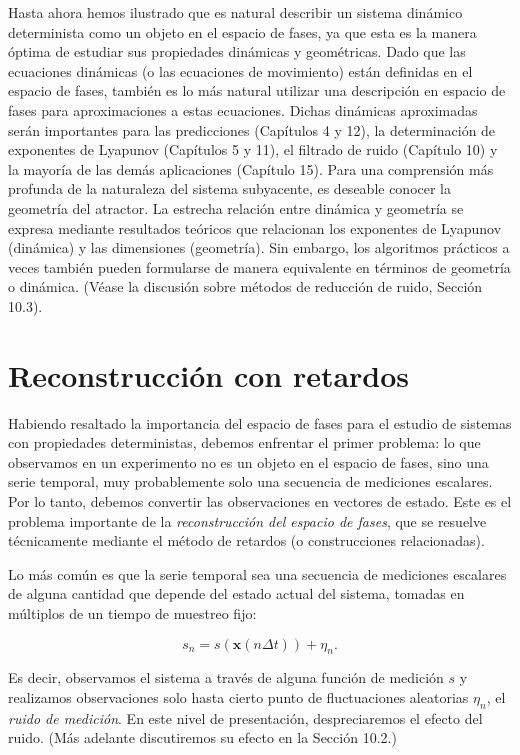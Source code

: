 \documentclass[10pt,a4paper]{book}
\begin{document}
Hasta ahora hemos ilustrado que es natural describir un sistema dinámico determinista como un objeto en el espacio de fases, ya que esta es la manera óptima de estudiar sus propiedades dinámicas y geométricas. Dado que las ecuaciones dinámicas (o las ecuaciones de movimiento) están definidas en el espacio de fases, también es lo más natural utilizar una descripción en espacio de fases para aproximaciones a estas ecuaciones. Dichas dinámicas aproximadas serán importantes para las predicciones (Capítulos 4 y 12), la determinación de exponentes de Lyapunov (Capítulos 5 y 11), el filtrado de ruido (Capítulo 10) y la mayoría de las demás aplicaciones (Capítulo 15). Para una comprensión más profunda de la naturaleza del sistema subyacente, es deseable conocer la geometría del atractor. La estrecha relación entre dinámica y geometría se expresa mediante resultados teóricos que relacionan los exponentes de Lyapunov (dinámica) y las dimensiones (geometría). Sin embargo, los algoritmos prácticos a veces también pueden formularse de manera equivalente en términos de geometría o dinámica. (Véase la discusión sobre métodos de reducción de ruido, Sección 10.3).

\newpage

\section{Reconstrucción con retardos}

Habiendo resaltado la importancia del espacio de fases para el estudio de sistemas con propiedades deterministas, debemos enfrentar el primer problema: lo que observamos en un experimento no es un objeto en el espacio de fases, sino una serie temporal, muy probablemente solo una secuencia de mediciones escalares. Por lo tanto, debemos convertir las observaciones en vectores de estado. Este es el problema importante de la \textit{reconstrucción del espacio de fases}, que se resuelve técnicamente mediante el método de retardos (o construcciones relacionadas).

Lo más común es que la serie temporal sea una secuencia de mediciones escalares de alguna cantidad que depende del estado actual del sistema, tomadas en múltiplos de un tiempo de muestreo fijo:

\begin{equation}
s_n = s(\mathbf{x}(n\Delta t)) + \eta_n .
\end{equation}

Es decir, observamos el sistema a través de alguna función de medición $s$ y realizamos observaciones solo hasta cierto punto de fluctuaciones aleatorias $\eta_n$, el \textit{ruido de medición}. En este nivel de presentación, despreciaremos el efecto del ruido. (Más adelante discutiremos su efecto en la Sección 10.2.)
\end{document}
